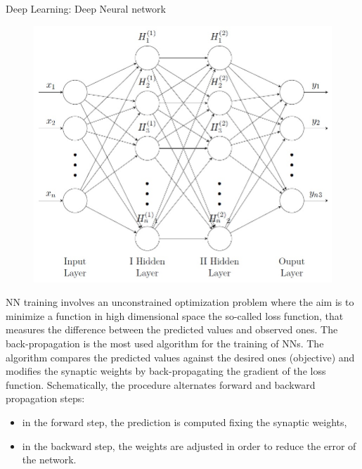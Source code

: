 \documentclass[12pt]{beamer}
\begin{document}
\begin{frame}{Deep Learning: Deep Neural network}
	\small
\begin{figure}
	\centering
	\includegraphics[width=.75\linewidth]{NNmodel}
\end{figure}
\end{frame}


\begin{frame}
\scriptsize
NN training involves an unconstrained optimization problem where the aim is to minimize a
function in high dimensional space the so-called loss function, that measures the difference between the predicted values and observed ones.
The back-propagation is the most used algorithm for the training of NNs. The algorithm compares the predicted values against the desired ones (objective)
and modifies the synaptic weights by back-propagating the gradient of the loss function. Schematically,
the procedure alternates forward and backward propagation steps:
\begin{itemize}
	\item in the forward step, the prediction is computed fixing the synaptic weights,
	\item in the backward step, the weights are adjusted in order to reduce the error of the network.
\end{itemize}

\end{frame}
\end{document}
